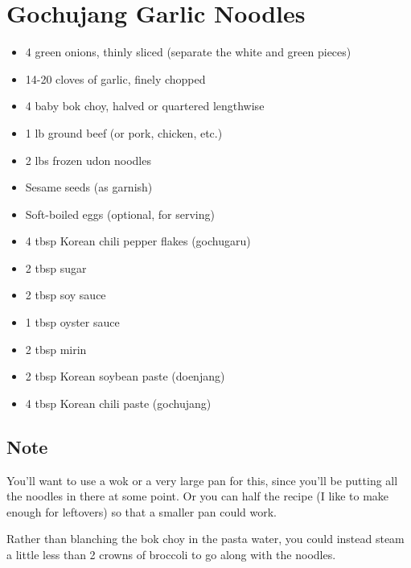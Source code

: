 \section{Gochujang Garlic Noodles}

\begin{itemize}
\item 4 green onions, thinly sliced (separate the white and green pieces)
\item 14-20 cloves of garlic, finely chopped
\item 4 baby bok choy, halved or quartered lengthwise
\item 1 lb ground beef (or pork, chicken, etc.)
\item 2 lbs frozen udon noodles
\item Sesame seeds (as garnish)
\item Soft-boiled eggs (optional, for serving)
\item 4 tbsp Korean chili pepper flakes (gochugaru)
\item 2 tbsp sugar
\item 2 tbsp soy sauce
\item 1 tbsp oyster sauce
\item 2 tbsp mirin
\item 2 tbsp Korean soybean paste (doenjang)
\item 4 tbsp Korean chili paste (gochujang)
\end{itemize}

\subsection{Note}

You’ll want to use a wok or a very large pan for this, since you’ll be putting all the noodles in there at some point.
Or you can half the recipe (I like to make enough for leftovers) so that a smaller pan could work.

Rather than blanching the bok choy in the pasta water, you could instead steam a little less than 2 crowns of broccoli
to go along with the noodles.

